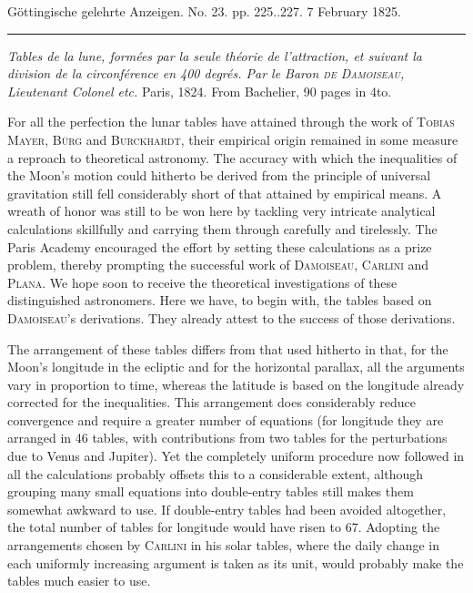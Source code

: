 \clearpage
{}
\begin{center}\small Göttingische gelehrte Anzeigen. No. 23. pp. 225..227. 7 February 1825.\\[3pt]\rule{.72\linewidth}{.3pt}\end{center}

\emph{Tables de la lune, formées par la seule théorie de l'attraction, et suivant la division de la circonférence en \textup{400} degrés. Par le Baron \textup{\textsc{de Damoiseau}}, Lieutenant Colonel etc.} Paris, 1824. From Bachelier, 90 pages in 4to.

For all the perfection the lunar tables have attained through the work of \textsc{Tobias Mayer}, \textsc{Bürg} and \textsc{Burckhardt}, their empirical origin remained in some measure a reproach to theoretical astronomy. The accuracy with which the inequalities of the Moon's motion could hitherto be derived from the principle of universal gravitation still fell considerably short of that attained by empirical means. A wreath of honor was still to be won here by tackling very intricate analytical calculations skillfully and carrying them through carefully and tirelessly. The Paris Academy encouraged the effort by setting these calculations as a prize problem, thereby prompting the successful work of \textsc{Damoiseau}, \textsc{Carlini} and \textsc{Plana}. We hope soon to receive the theoretical investigations of these distinguished astronomers. Here we have, to begin with, the tables based on \textsc{Damoiseau}'s derivations. They already attest to the success of those derivations.

The arrangement of these tables differs from that used hitherto in that, for the Moon's longitude in the ecliptic and for the horizontal parallax, all the arguments vary in proportion to time, whereas the latitude is based on the longitude already corrected for the inequalities. This arrangement does considerably reduce convergence and require a greater number of equations (for longitude they are arranged in 46 tables, with contributions from two tables for the perturbations due to Venus and Jupiter). Yet the completely uniform procedure now followed in all the calculations probably offsets this to a considerable extent, although grouping many small equations into double-entry tables still makes them somewhat awkward to use. If double-entry tables had been avoided altogether, the total number of tables for longitude would have risen to 67. Adopting the arrangements chosen by \textsc{Carlini} in his solar tables, where the daily change in each uniformly increasing argument is taken as its unit, would probably make the tables much easier to use.

